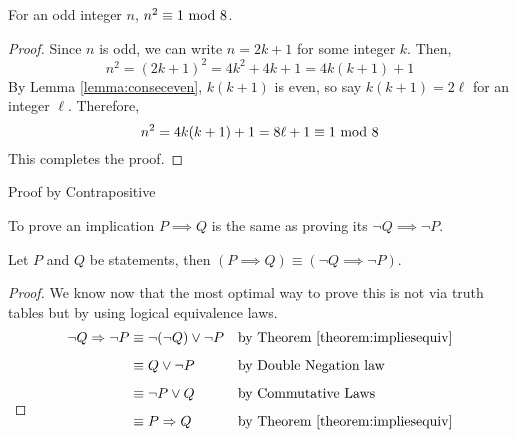 \begin{proposition}
For an odd integer $n$, $n^2 \equiv 1 \modar{8}$.
\end{proposition}
\begin{proof}
Since $n$ is odd, we can write $n = 2k + 1$ for some integer $k$. Then,
\[n^2 = (2k + 1)^2 = 4k^2 + 4k + 1 = 4k(k + 1) + 1\]
By Lemma \ref{lemma:conseceven}, $k(k+1)$ is even, so say $k(k+1) = 2\ell$ for an integer $\ell$. Therefore,
\[n^2 = 4k(k + 1) + 1 = 8\ell + 1 \equiv 1 \modar{8}\]
This completes the proof.
\end{proof}

\vspace*{2em}

\begin{mdframed}
\begin{center}
{\Large Proof by Contrapositive}
\end{center}
\end{mdframed}

\begin{discussion}
To prove an implication $P \implies Q$ is the same as proving its  $\neg Q \implies \neg P$.
\end{discussion}

\vspace*{1em}

\begin{theorem}
Let $P$ and $Q$ be statements, then $(P \implies Q) \equiv (\neg Q \implies \neg P)$.
\end{theorem}
\begin{proof}
We know now that the most optimal way to prove this is not via truth tables but by using logical equivalence laws.
\begin{align*}
\neg Q \implies \neg P &\equiv \neg (\neg Q) \vee \neg P && \text{by Theorem \ref{theorem:impliesequiv}}\\[0.5em]
 &\equiv Q \vee \neg P && \text{by Double Negation law}\\[0.5em]
 &\equiv \neg P \vee Q && \text{by Commutative Laws}\\[0.5em]
 &\equiv P \implies Q && \text{by Theorem \ref{theorem:impliesequiv}}\\[-3em]
\end{align*}
\end{proof}

\vspace*{1em}

